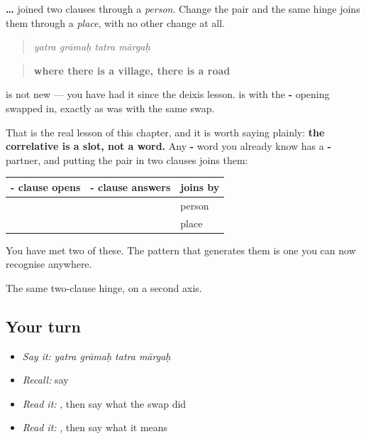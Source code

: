 \begin{grammarlens}[title={Grammar Lens: the hinge is not about people}]
\textbf{ … } joined two clauses through a \emph{person}. Change the pair and the same hinge joins them through a \emph{place}, with no other change at all.

\begin{quote}
\textbf{   }
\end{quote}

\begin{quote}
\emph{yatra grāmaḥ tatra mārgaḥ}
\end{quote}

\begin{quote}
\textbf{where there is a village, there is a road}
\end{quote}

\textbf{} is not new — you have had it since the deixis lesson. \textbf{} is \textbf{} with the \textbf{-} opening swapped in, exactly as \textbf{} was \textbf{} with the same swap.

That is the real lesson of this chapter, and it is worth saying plainly: \textbf{the correlative is a slot, not a word.} Any \textbf{-} word you already know has a \textbf{-} partner, and putting the pair in two clauses joins them:

\noindent
\begin{tabularx}{\linewidth}{@{}>{\raggedright\arraybackslash}X>{\raggedright\arraybackslash}X>{\raggedright\arraybackslash}X@{}}
\toprule
\textbf{\sk{य}- clause opens} & \textbf{\sk{त}- clause answers} & \textbf{joins by} \\
\midrule
\textbf{\sk{यः}} & \textbf{\sk{सः}} & person \\
\textbf{\sk{यत्र}} & \textbf{\sk{तत्र}} & place \\
\bottomrule
\end{tabularx}

You have met two of these. The pattern that generates them is one you can now recognise anywhere.
\end{grammarlens}

\begin{grammarlens}[title={What you've built}]
The same two-clause hinge, on a second axis.
\end{grammarlens}

\subsection*{Your turn}
\begin{itemize}
\raggedright
  \item \emph{Say it:} \emph{yatra grāmaḥ tatra mārgaḥ}
  \item \emph{Recall:} say \textbf{}
  \item \emph{Read it:} \textbf{}, then say what the swap did
  \item \emph{Read it:} \textbf{   }, then say what it means
\end{itemize}

